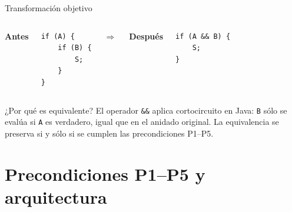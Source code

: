 \documentclass[aspectratio=169, 10pt]{beamer}
\begin{document}
\begin{frame}[fragile]{Transformación objetivo}
  \begin{columns}[T]
      \textbf{Antes}
      \begin{lstlisting}[style=java]
if (A) {
    if (B) {
        S;
    }
}
      \end{lstlisting}

      \vspace{1.5cm}
      \centering $\Rightarrow$

      \textbf{Después}
      \begin{lstlisting}[style=java]
if (A && B) {
    S;
}
      \end{lstlisting}
  \end{columns}

  \vspace{0.6em}
  \begin{alertblock}{¿Por qué es equivalente?}
    El operador \texttt{\&\&} aplica cortocircuito en Java: \texttt{B} sólo se
    evalúa si \texttt{A} es verdadero, igual que en el anidado original.
    La equivalencia se preserva si y sólo si se cumplen las precondiciones P1--P5.
  \end{alertblock}
\end{frame}

\section{Precondiciones P1--P5 y arquitectura}
\end{document}
